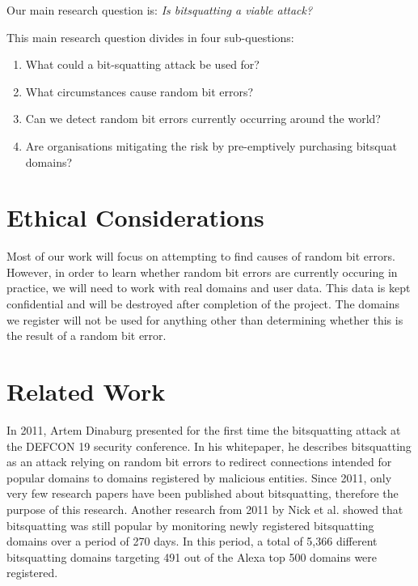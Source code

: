 \documentclass[conference]{IEEEtran}
\begin{document}
Our main research question is:
{\it Is bitsquatting a viable attack?}

\vspace{0.1cm}

\noindent{} This main research question divides in four sub-questions:

\begin{enumerate}
    \item What could a bit-squatting attack be used for?
	\item What circumstances cause random bit errors?
	\item Can we detect random bit errors currently occurring around the world?
	\item Are organisations mitigating the risk by pre-emptively purchasing
	      bitsquat domains?
\end{enumerate}


\section{Ethical Considerations}\label{sec:ethics}

Most of our work will focus on attempting to find causes of random bit errors.
However, in order to learn whether random bit errors are currently occuring in
practice, we will need to work with real domains and user data. This data is
kept confidential and will be destroyed after completion of the project. The
domains we register will not be used for anything other than determining
whether this is the result of a random bit error.


\section{Related Work}\label{sec:relwork}

In 2011, Artem Dinaburg presented for the first time the bitsquatting attack at
the DEFCON 19 security conference. In his
whitepaper\cite{dinaburg2011bitsquatting}, he describes bitsquatting as an
attack relying on random bit errors to redirect connections intended for
popular domains to domains registered by malicious entities. Since 2011, only
very few research papers have been published about bitsquatting, therefore the
purpose of this research. Another research from 2011 by Nick et
al.\cite{nikiforakis2013bitsquatting} showed that bitsquatting was still
popular by monitoring newly registered bitsquatting domains over a period of
270 days. In this period, a total of 5,366 different bitsquatting domains
targeting 491 out of the Alexa top 500 domains were registered.
\end{document}

